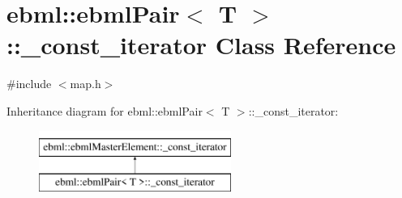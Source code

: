 \hypertarget{classebml_1_1ebmlPair_1_1__const__iterator}{}\section{ebml\+:\+:ebml\+Pair$<$ T $>$\+:\+:\+\_\+const\+\_\+iterator Class Reference}
\label{classebml_1_1ebmlPair_1_1__const__iterator}


{\ttfamily \#include $<$map.\+h$>$}

Inheritance diagram for ebml\+:\+:ebml\+Pair$<$ T $>$\+:\+:\+\_\+const\+\_\+iterator\+:\begin{figure}[H]
\begin{center}
\leavevmode
\includegraphics[height=2.000000cm]{classebml_1_1ebmlPair_1_1__const__iterator}
\end{center}
\end{figure}
